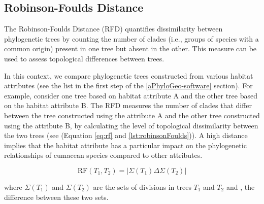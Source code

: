 \subsection{Robinson-Foulds Distance}\label{RF}

The Robinson-Foulds Distance (RFD) quantifies dissimilarity between phylogenetic trees by counting the number of clades (i.e., groups of species with a common origin) present in one tree but absent in the other. This measure can be used to assess topological differences between trees. 

In this context, we compare phylogenetic trees constructed from various habitat attributes (see the list in the first step of the \autoref{aPhyloGeo-software} section). For example, consider one tree based on habitat attribute A and the other tree based on the habitat attribute B. The RFD measures the number of clades that differ between the tree constructed using the attribute A and the other tree constructed using the attribute B, by calculating the level of topological dissimilarity between the two trees (see (Equation \eqref{eq:rf} and \autoref{lst:robinsonFoulds})). A high distance implies that the habitat attribute has a particular impact on the phylogenetic relationships of cumacean species compared to other attributes.

\begin{equation}\label{eq:rf}
    \text{RF}(T_1, T_2) = | \Sigma(T_1) \Delta \Sigma(T_2) |
\end{equation}

where $\Sigma(T_1)$ and $\Sigma(T_2)$ are the sets of divisions in trees $T_1$ and $T_2$ and \Delta, the difference between these two sets.

